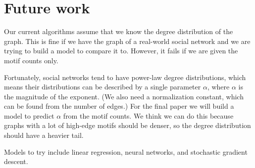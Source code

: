 \section{Future work}
\label{sec:futurework}

Our current algorithms assume that we know the degree distribution of the graph.  This is fine if we have the graph of a real-world social network and we are trying to build a model to compare it to.  However, it fails if we are given the motif counts only.

Fortunately, social networks tend to have power-law degree distributions, which means their distributions can be described by a single parameter $\alpha$, where $\alpha$ is the magnitude of the exponent.  (We also need a normalization constant, which can be found from the number of edges.)  For the final paper we will build a model to predict $\alpha$ from the motif counts.  We think we can do this because graphs with a lot of high-edge motifs should be denser, so the degree distribution should have a heavier tail.

Models to try include linear regression, neural networks, and stochastic gradient descent.
